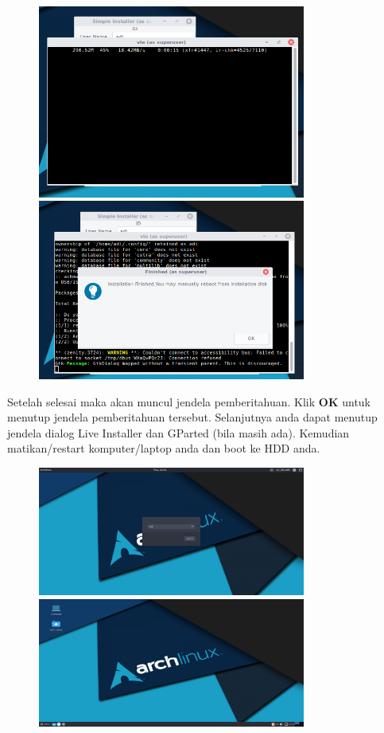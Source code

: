 \documentclass[12pt,]{article}
\begin{document}
	\begin{figure}[!ht]
		\centering
		\includegraphics[width=250pt]{installhdd/step_19}
		\includegraphics[width=250pt]{installhdd/step_20}
	\end{figure}

	Setelah selesai maka akan muncul jendela pemberitahuan.
	Klik \textbf{OK} untuk menutup jendela pemberitahuan tersebut.
	Selanjutnya anda dapat menutup jendela dialog Live Installer dan GParted (bila masih ada).
	Kemudian matikan/restart komputer/laptop anda dan boot ke HDD anda.
	
	\begin{figure}[!ht]
		\centering
		\includegraphics[width=250pt]{installhdd/step_21}
		\includegraphics[width=250pt]{installhdd/step_22}
	\end{figure}
	
\end{document}
